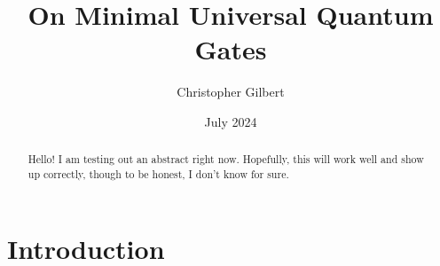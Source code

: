 \documentclass{article}
\title{On Minimal Universal Quantum Gates}
\author{Christopher Gilbert}
\date{July 2024}
\begin{document}
\maketitle

\begin{abstract}
    Hello! I am testing out an abstract right now. Hopefully, this will work well and show up correctly, though to be honest, I don't know for sure.
\end{abstract}

\section{Introduction}

\text{}
\end{document}
